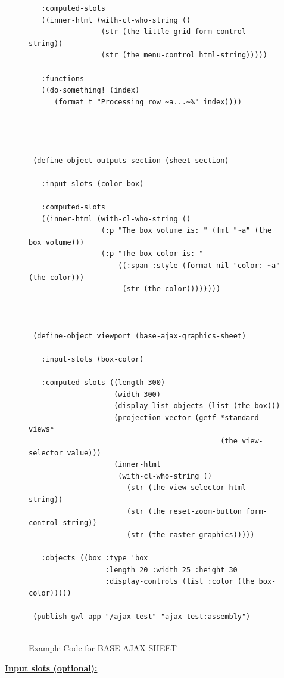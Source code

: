 \documentclass [11pt]{book}
\begin{document}
\begin{itemize}
\begin{figure}
\begin{lrbox}{\boxedverb}
\begin{minipage}{\linewidth}
{\begin{verbatim}
   :computed-slots 
   ((inner-html (with-cl-who-string ()
                 (str (the little-grid form-control-string))
                 (str (the menu-control html-string)))))
   
   :functions
   ((do-something! (index)
      (format t "Processing row ~a...~%" index))))




 (define-object outputs-section (sheet-section)
   
   :input-slots (color box)
  
   :computed-slots 
   ((inner-html (with-cl-who-string ()
                 (:p "The box volume is: " (fmt "~a" (the box volume)))
                 (:p "The box color is: " 
                     ((:span :style (format nil "color: ~a" (the color)))
                      (str (the color))))))))



 (define-object viewport (base-ajax-graphics-sheet)
  
   :input-slots (box-color)

   :computed-slots ((length 300)
                    (width 300)
                    (display-list-objects (list (the box)))
                    (projection-vector (getf *standard-views* 
                                             (the view-selector value)))
                    (inner-html
                     (with-cl-who-string ()
                       (str (the view-selector html-string))
                       (str (the reset-zoom-button form-control-string))
                       (str (the raster-graphics)))))
  
   :objects ((box :type 'box 
                  :length 20 :width 25 :height 30
                  :display-controls (list :color (the box-color)))))
   
 (publish-gwl-app "/ajax-test" "ajax-test:assembly")


\end{verbatim}}
\end{minipage}
\end{lrbox}
\fbox{\usebox{\boxedverb}}

\caption{Example Code for BASE-AJAX-SHEET}

\label{fig:example-code-BASE-AJAX-SHEET}

\end{figure}





\textbf{
\underline{Input slots (optional):}}


\end{itemize}
\end{document}
